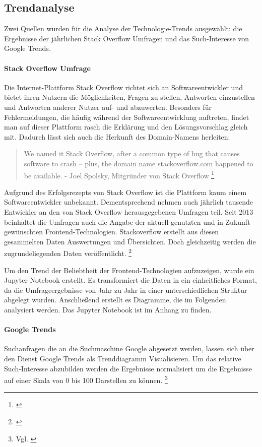 

\subsection{Trendanalyse}

Zwei Quellen wurden für die Analyse der Technologie-Trends ausgewählt: die Ergebnisse der jährlichen Stack Overflow Umfragen und das Such-Interesse von Google Trends. 

\paragraph{Stack Overflow Umfrage}
Die Internet-Plattform Stack Overflow richtet sich an Softwareentwickler und bietet ihren Nutzern die Möglichkeiten, Fragen zu stellen, Antworten einzustellen und Antworten anderer Nutzer auf- und abzuwerten. 
Besonders für Fehlermeldungen, die häufig während der Softwareentwicklung auftreten, findet man auf dieser Plattform rasch die Erklärung und den Lösungsvorschlag gleich mit. Dadurch lässt sich auch die Herkunft des Domain-Namens herleiten:

\begin{quotation}
We named it Stack Overflow, after a common type of bug that causes software to crash -- plus, the domain name stackoverflow.com happened to be available. - Joel Spolsky, Mitgründer von Stack Overflow \footnote{\cite{TheUnprovenPath}}
\end{quotation}

Aufgrund des Erfolgsrezepts von Stack Overflow ist die Plattform kaum einem Softwareentwickler unbekannt. Dementsprechend nehmen auch jährlich tausende Entwickler an den von Stack Overflow herausgegebenen Umfragen teil. Seit  2013 beinhaltet die Umfragen auch die Angabe der aktuell genutzten und in Zukunft gewünschten Frontend-Technologien.
Stackoverflow erstellt aus diesen gesammelten Daten Auswertungen und Übersichten. Doch gleichzeitig werden die zugrundeliegenden Daten veröffentlicht. \footnote{\cite{StackOverflowInsights}} 

Um den Trend der Beliebtheit der Frontend-Technologien aufzuzeigen, wurde ein Jupyter Notebook erstellt. Es transformiert die Daten in ein einheitliches Format, da die  Umfrageergebnisse von Jahr zu Jahr in einer unterschiedlichen Struktur abgelegt wurden. Anschließend erstellt es Diagramme, die im Folgenden analysiert werden. Das Jupyter Notebook ist im  Anhang zu finden.

\paragraph{Google Trends} Suchanfragen die an die Suchmaschine Google  abgesetzt werden, lassen sich  über den Dienst Google Trends  als Trenddiagramm Visualisieren. Um das relative Such-Interesse abzubilden werden die Ergebnisse normalisiert um die Ergebnisse auf einer Skala von 0 bis 100 Darstellen zu können. \footnote{Vgl. \cite{GoogleTrendsHilfe}}

